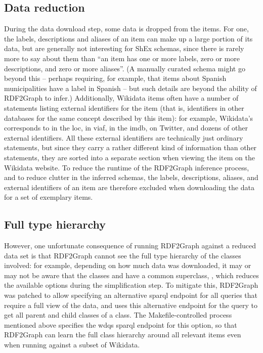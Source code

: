 \subsection{Data reduction}
\label{subsec:RDF2Graph+Wikidata:Wikidata:reduction}

During the data download step, some data is dropped from the items.
For one, the labels, descriptions and aliases of an item can make up a large portion of its data,
but are generally not interesting for ShEx schemas,
since there is rarely more to say about them than
“an item has one or more labels, zero or more descriptions, and zero or more aliases”. %
(A manually curated schema might go beyond this –
perhaps requiring, for example, that items about Spanish municipalities have a label in Spanish –
but such details are beyond the ability of RDF2Graph to infer.)
Additionally, Wikidata items often have a number of statements listing external identifiers for the item
(that is, identifiers in other databases for the same concept described by this item):
for example, Wikidata’s  corresponds to  in the \gls{loc},
 in \gls{viaf},
 in the \gls{imdb},
 on Twitter,
and dozens of other external identifiers. %
All these external identifiers are technically just ordinary statements,
but since they carry a rather different kind of information than other statements,
they are sorted into a separate section when viewing the item on the Wikidata website.
To reduce the runtime of the RDF2Graph inference process,
and to reduce clutter in the inferred schemas,
the labels, descriptions, aliases, and external identifiers of an item
are therefore excluded when downloading the data for a set of exemplary items.

\subsection{Full type hierarchy}
\label{subsec:RDF2Graph+Wikidata:Wikidata:hierarchy}

However, one unfortunate consequence of running RDF2Graph against a reduced data set
is that RDF2Graph cannot see the full type hierarchy of the classes involved:
for example, depending on how much data was downloaded,
it may or may not be aware that the classes  and 
have a common superclass, ,
which reduces the available options during the simplification step. %
To mitigate this, RDF2Graph was patched %
to allow specifying an alternative \gls{sparql} endpoint for all queries that require a full view of the data,
and uses this alternative endpoint for the query to get all parent and child classes of a class.
The Makefile-controlled process mentioned above %
specifies the \gls{wdqs} \gls{sparql} endpoint for this option,
so that RDF2Graph can learn the full class hierarchy around all relevant items %
even when running against a subset of Wikidata. %

